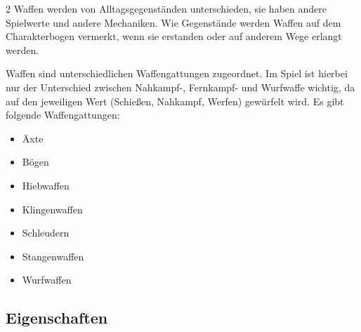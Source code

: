 \begin{multicols}{2}
Waffen werden von Alltagsgegenständen unterschieden, sie haben andere Spielwerte und andere Mechaniken. Wie Gegenstände werden Waffen auf dem Charakterbogen vermerkt, wenn sie erstanden oder auf anderem Wege erlangt werden.

Waffen sind unterschiedlichen Waffengattungen zugeordnet. Im Spiel ist hierbei nur der Unterschied zwischen Nahkampf-, Fernkampf- und Wurfwaffe wichtig, da auf den jeweiligen Wert (Schießen, Nahkampf, Werfen) gewürfelt wird. Es gibt folgende Waffengattungen:
\begin{itemize}
    \item Äxte
    \item Bögen
    \item Hiebwaffen
    \item Klingenwaffen
    \item Schleudern
    \item Stangenwaffen
    \item Wurfwaffen
\end{itemize}


\subsection{Eigenschaften}


\end{multicols}
